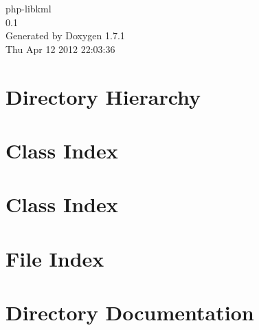 \documentclass[a4paper]{book}
\begin{document}
\hypersetup{pageanchor=false}
\begin{titlepage}
\vspace*{7cm}
\begin{center}
{\Large php-\/libkml \\[1ex]\large 0.1 }\\
\vspace*{1cm}
{\large Generated by Doxygen 1.7.1}\\
\vspace*{0.5cm}
{\small Thu Apr 12 2012 22:03:36}\\
\end{center}
\end{titlepage}
\clearemptydoublepage
{}
\tableofcontents
\clearemptydoublepage
{}
\hypersetup{pageanchor=true}
\chapter{Directory Hierarchy}

\chapter{Class Index}

\chapter{Class Index}

\chapter{File Index}

\chapter{Directory Documentation}













\end{document}
